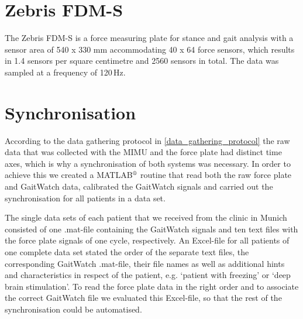 \section{Zebris FDM-S}

The Zebris FDM-S \cite{zebris_force_plate_2013} is a force measuring plate for stance and gait analysis with a sensor area of 540 x 330 mm accommodating 40 x 64 force sensors, which results in 1.4 sensors per square centimetre and 2560 sensors in total. The data was sampled at a frequency of 120\,Hz.

\section{Synchronisation}

According to the data gathering protocol in \ref{data_gathering_protocol} the raw data that was collected with the MIMU and the force plate had distinct time axes, which is why a synchronisation of both systems was necessary. In order to achieve this we created a MATLAB$\textsuperscript{\textregistered}$ routine that read both the raw force plate and GaitWatch data, calibrated the GaitWatch signals and carried out the synchronisation for all patients in a data set.

The single data sets of each patient that we received from the clinic in Munich consisted of one .mat-file containing the GaitWatch signals and ten text files with the force plate signals of one cycle, respectively. An Excel-file for all patients of one complete data set stated the order of the separate text files, the corresponding GaitWatch .mat-file, their file names as well as additional hints and characteristics in respect of the patient, e.g. `patient with freezing' or `deep brain stimulation'. To read the force plate data in the right order and to associate the correct GaitWatch file we evaluated this Excel-file, so that the rest of the synchronisation could be automatised.

